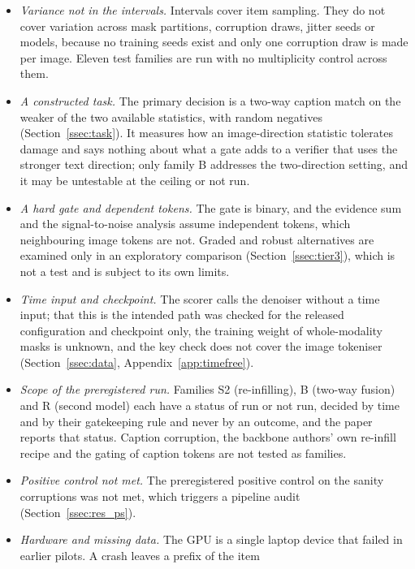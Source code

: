 \begin{itemize}
harms JPEG images, so the denoising contrast on JPEG favours the gate.
\item \emph{Variance not in the intervals.} Intervals cover item sampling. They do not cover variation across mask partitions, corruption
draws, jitter seeds or models, because no training seeds exist and only one corruption draw is made per image. Eleven test families
are run with no multiplicity control across them.
\item \emph{A constructed task.} The primary decision is a two-way caption match on the weaker of the two available statistics, with
random negatives (Section~\ref{ssec:task}). It measures how an image-direction statistic tolerates damage and says nothing about
what a gate adds to a verifier that uses the stronger text direction; only family B addresses the two-direction setting, and it may be
untestable at the ceiling or not run.
\item \emph{A hard gate and dependent tokens.} The gate is binary, and the evidence sum and the signal-to-noise analysis assume
independent tokens, which neighbouring image tokens are not. Graded and robust alternatives are examined only in an exploratory
comparison (Section~\ref{ssec:tier3}), which is not a test and is subject to its own limits.
\item \emph{Time input and checkpoint.} The scorer calls the denoiser without a time input; that this is the intended path was checked
for the released configuration and checkpoint only, the training weight of whole-modality masks is unknown, and the key check does not
cover the image tokeniser (Section~\ref{ssec:data}, Appendix~\ref{app:timefree}).
\item \emph{Scope of the preregistered run.} Families S2 (re-infilling), B (two-way fusion) and R (second model) each have a status of
run or not run, decided by time and by their gatekeeping rule and never by an outcome, and the paper reports that status.
Caption corruption, the backbone authors' own re-infill recipe and the gating of caption tokens are not tested as families.
\item \emph{Positive control not met.} The preregistered positive control on the sanity corruptions was not met, which triggers a
pipeline audit (Section~\ref{ssec:res_ps}). 
\item \emph{Hardware and missing data.} The GPU is a single laptop device that failed in earlier pilots. A crash leaves a prefix of the item

\end{itemize}
